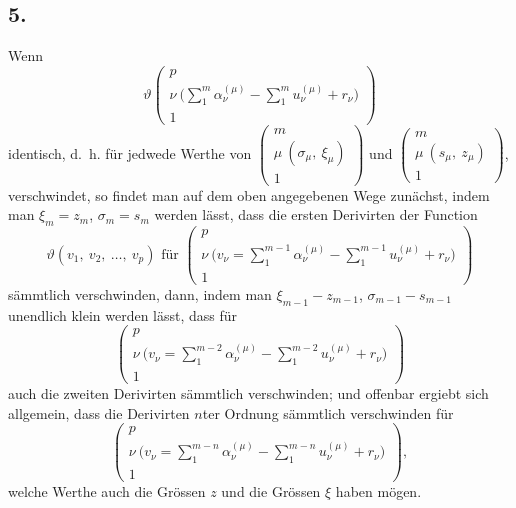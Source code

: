 \documentclass[12pt,a4paper]{article}
\begin{document}
\subsection*{5.}

Wenn
\begin{equation}
\tag{1} \vartheta\left(\begin{array}{c} p\\ \nu\ \bigl(\sum\limits_1^m \alpha_\nu^{(\mu)} - \sum\limits_1^m u_\nu^{(\mu)} + r_\nu\bigr)\\ 1 \end{array}\right) \end{equation}
identisch, d.~h. für jedwede Werthe von $\left(\begin{array}{c} m\\ \mu\ (\sigma_\mu,\ \xi_\mu)\\ 1 \end{array}\right)$ und $\left(\begin{array}{c} m\\ \mu\ (s_\mu,\ z_\mu)\\ 1 \end{array}\right)$, verschwindet, so findet man auf dem oben angegebenen Wege zunächst, indem man $\xi_m = z_m$, $\sigma_m = s_m$ werden lässt, dass die ersten Derivirten der Function
\[ \vartheta(v_1,\ v_2,\ \ldots,\ v_p) \text{ für } \left(\begin{array}{c} p\\ \nu\ \bigl(v_\nu = \sum\limits_1^{m-1} \alpha_\nu^{(\mu)} - \sum\limits_1^{m-1} u_\nu^{(\mu)} + r_\nu\bigr)\\ 1 \end{array}\right) \]
sämmtlich verschwinden, dann, indem man $\xi_{m-1} - z_{m-1}$, $\sigma_{m-1} - s_{m-1}$ unendlich klein werden lässt, dass für
\[ \left(\begin{array}{c} p\\ \nu\ \bigl(v_\nu = \sum\limits_1^{m-2} \alpha_\nu^{(\mu)} - \sum\limits_1^{m-2} u_\nu^{(\mu)} + r_\nu\bigr)\\ 1 \end{array}\right) \]
auch die zweiten Derivirten sämmtlich verschwinden; und offenbar ergiebt sich allgemein, dass die Derivirten $n$ter Ordnung sämmtlich verschwinden für
\[ \left(\begin{array}{c} p\\ \nu\ \bigl(v_\nu = \sum\limits_1^{m-n} \alpha_\nu^{(\mu)} - \sum\limits_1^{m-n} u_\nu^{(\mu)} + r_\nu\bigr)\\ 1 \end{array}\right), \]
welche Werthe auch die Grössen $z$ und die Grössen $\xi$ haben mögen.
\end{document}
